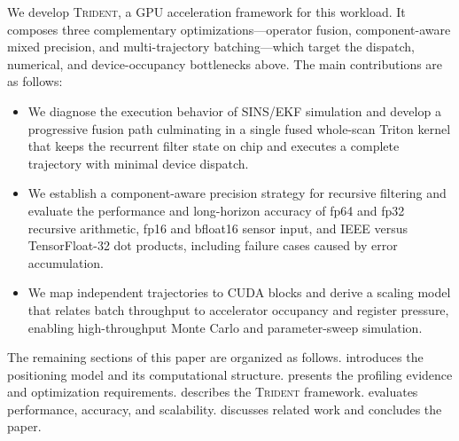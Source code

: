 We develop \textsc{Trident}, a GPU acceleration framework for this workload. It composes three complementary optimizations---operator fusion, component-aware mixed precision, and multi-trajectory batching---which target the dispatch, numerical, and device-occupancy bottlenecks above. The main contributions are as follows:

\begin{itemize}
  \item We diagnose the execution behavior of SINS/EKF simulation and develop a progressive fusion path culminating in a single fused whole-scan Triton kernel that keeps the recurrent filter state on chip and executes a complete trajectory with minimal device dispatch.
  \item We establish a component-aware precision strategy for recursive filtering and evaluate the performance and long-horizon accuracy of fp64 and fp32 recursive arithmetic, fp16 and bfloat16 sensor input, and IEEE versus TensorFloat-32 dot products, including failure cases caused by error accumulation.
  \item We map independent trajectories to CUDA blocks and derive a scaling model that relates batch throughput to accelerator occupancy and register pressure, enabling high-throughput Monte Carlo and parameter-sweep simulation.
\end{itemize}

The remaining sections of this paper are organized as follows.  introduces the positioning model and its computational structure.  presents the profiling evidence and optimization requirements.  describes the \textsc{Trident} framework.  evaluates performance, accuracy, and scalability.  discusses related work and  concludes the paper.
